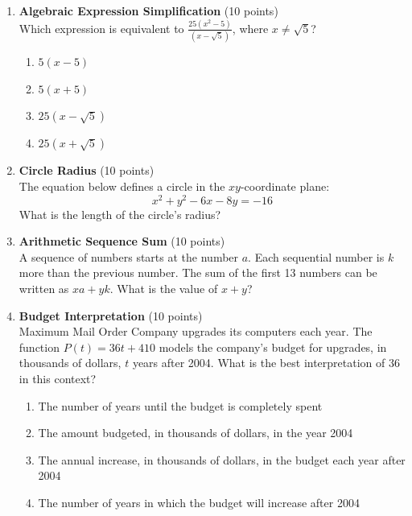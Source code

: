 \begin{enumerate}
  \item \textbf{Algebraic Expression Simplification} (10 points)\\
  Which expression is equivalent to $\frac{25(x^2 - 5)}{(x - \sqrt{5})}$, where $x \neq \sqrt{5}$?
  \begin{enumerate}[label=\Alph*.]
    \item $5(x - 5)$
    \item $5(x + 5)$
    \item $25(x - \sqrt{5})$
    \item $25(x + \sqrt{5})$
  \end{enumerate}
  \begin{subanswer}
  \end{subanswer}

  \item \textbf{Circle Radius} (10 points)\\
  The equation below defines a circle in the $xy$-coordinate plane:
  \[
    x^2 + y^2 - 6x - 8y = -16
  \]
  What is the length of the circle's radius?
  \begin{subanswer}
  \end{subanswer}

  \item \textbf{Arithmetic Sequence Sum} (10 points)\\
  A sequence of numbers starts at the number $a$. Each sequential number is $k$ more than the previous number. The sum of the first 13 numbers can be written as $xa + yk$. What is the value of $x + y$?
  \begin{subanswer}
  \end{subanswer}



  \newpage


  
  \item \textbf{Budget Interpretation} (10 points)\\
  Maximum Mail Order Company upgrades its computers each year. The function $P(t)=36 t+410$ models the company's budget for upgrades, in thousands of dollars, $t$ years after 2004. What is the best interpretation of 36 in this context?
  \begin{enumerate}[label=\Alph*.]
    \item The number of years until the budget is completely spent
    \item The amount budgeted, in thousands of dollars, in the year 2004
    \item The annual increase, in thousands of dollars, in the budget each year after 2004
    \item The number of years in which the budget will increase after 2004
  \end{enumerate}
  \begin{subanswer}
  \end{subanswer}


\end{enumerate}
